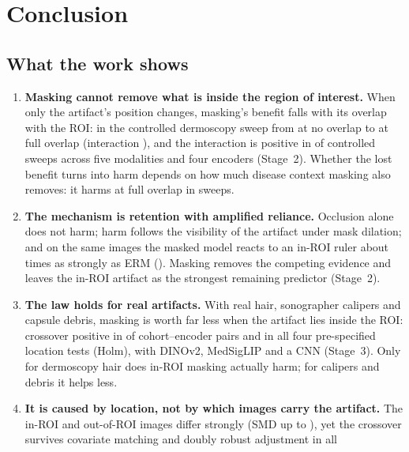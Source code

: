
\clearpage

\clearpage

\clearpage

\clearpage

\clearpage

\clearpage

\clearpage

\clearpage

\clearpage

\section{Conclusion}\label{sec:conclusion}
\subsection{What the work shows}
\begin{enumerate}[leftmargin=*]\itemsep2pt
\item \textbf{Masking cannot remove what is inside the region of interest.} When only the artifact's position changes,
masking's benefit falls with its overlap with the ROI: in the controlled dermoscopy sweep from \sTwoMaskZero{} at no
overlap to \sTwoMaskOneZeroZero{} at full overlap (interaction \sTwoInter), and the interaction is positive in
\sTwoNInterPos{} of \sTwoNSweeps{} controlled sweeps across five modalities and four encoders (Stage~2). Whether the lost
benefit turns into harm depends on how much disease context masking also removes: it harms at full overlap in
\sTwoNHarmFull{} sweeps.
\item \textbf{The mechanism is retention with amplified reliance.} Occlusion alone does not harm; harm follows the
visibility of the artifact under mask dilation; and on the same images the masked model reacts to an in-ROI ruler about
\sTwoDpRatioFull{} times as strongly as ERM (\sTwoDpDiffFull). Masking removes the competing evidence and leaves the
in-ROI artifact as the strongest remaining predictor (Stage~2).
\item \textbf{The law holds for real artifacts.} With real hair, sonographer calipers and capsule debris, masking is
worth far less when the artifact lies inside the ROI: crossover positive in \sThreeNXPos{} of \sThreeNRuns{} cohort--encoder
pairs and in all four pre-specified location tests (Holm), with DINOv2, MedSigLIP and a CNN (Stage~3). Only for
dermoscopy hair does in-ROI masking actually harm; for calipers and debris it helps less.
\item \textbf{It is caused by location, not by which images carry the artifact.} The in-ROI and out-of-ROI images differ
strongly (SMD up to \sFourSmdBeforeCap), yet the crossover survives covariate matching and doubly robust adjustment in all

\end{enumerate}
